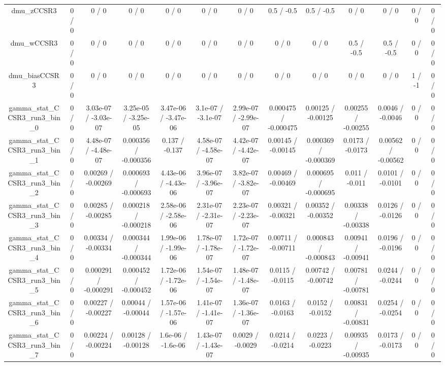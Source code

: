 \documentclass[10pt]{article}
\begin{document}
\begin{table}[htbp]
\begin{center}
\begin{tabular}{|c|c|c|c|c|c|c|c|c|c|c|c|c|}
  dmu_zCCSR3 & 0 / 0 & 0 / 0 & 0 / 0 & 0 / 0 & 0 / 0 & 0 / 0 & 0.5 / -0.5 & 0.5 / -0.5 & 0 / 0 & 0 / 0 & 0 / 0 & 0 / 0 \\ 
  dmu_wCCSR3 & 0 / 0 & 0 / 0 & 0 / 0 & 0 / 0 & 0 / 0 & 0 / 0 & 0 / 0 & 0 / 0 & 0.5 / -0.5 & 0.5 / -0.5 & 0 / 0 & 0 / 0 \\ 
  dmu_biasCCSR3 & 0 / 0 & 0 / 0 & 0 / 0 & 0 / 0 & 0 / 0 & 0 / 0 & 0 / 0 & 0 / 0 & 0 / 0 & 0 / 0 & 1 / -1 & 0 / 0 \\ 
  gamma_stat_CCSR3_run3_bin_0 & 0 / 0 & 3.03e-07 / -3.03e-07 & 3.25e-05 / -3.25e-05 & 3.47e-06 / -3.47e-06 & 3.1e-07 / -3.1e-07 & 2.99e-07 / -2.99e-07 & 0.000475 / -0.000475 & 0.00125 / -0.00125 & 0.00255 / -0.00255 & 0.0046 / -0.0046 & 0 / 0 & 0 / 0 \\ 
  gamma_stat_CCSR3_run3_bin_1 & 0 / 0 & 4.48e-07 / -4.48e-07 & 0.000356 / -0.000356 & 0.137 / -0.137 & 4.58e-07 / -4.58e-07 & 4.42e-07 / -4.42e-07 & 0.00145 / -0.00145 & 0.000369 / -0.000369 & 0.0173 / -0.0173 & 0.00562 / -0.00562 & 0 / 0 & 0 / 0 \\ 
  gamma_stat_CCSR3_run3_bin_2 & 0 / 0 & 0.00269 / -0.00269 & 0.000693 / -0.000693 & 4.43e-06 / -4.43e-06 & 3.96e-07 / -3.96e-07 & 3.82e-07 / -3.82e-07 & 0.00469 / -0.00469 & 0.000695 / -0.000695 & 0.011 / -0.011 & 0.0101 / -0.0101 & 0 / 0 & 0 / 0 \\ 
  gamma_stat_CCSR3_run3_bin_3 & 0 / 0 & 0.00285 / -0.00285 & 0.000218 / -0.000218 & 2.58e-06 / -2.58e-06 & 2.31e-07 / -2.31e-07 & 2.23e-07 / -2.23e-07 & 0.00321 / -0.00321 & 0.00352 / -0.00352 & 0.00338 / -0.00338 & 0.0126 / -0.0126 & 0 / 0 & 0 / 0 \\ 
  gamma_stat_CCSR3_run3_bin_4 & 0 / 0 & 0.00334 / -0.00334 & 0.000344 / -0.000344 & 1.99e-06 / -1.99e-06 & 1.78e-07 / -1.78e-07 & 1.72e-07 / -1.72e-07 & 0.00711 / -0.00711 & 0.000843 / -0.000843 & 0.00941 / -0.00941 & 0.0196 / -0.0196 & 0 / 0 & 0 / 0 \\ 
  gamma_stat_CCSR3_run3_bin_5 & 0 / 0 & 0.000291 / -0.000291 & 0.000452 / -0.000452 & 1.72e-06 / -1.72e-06 & 1.54e-07 / -1.54e-07 & 1.48e-07 / -1.48e-07 & 0.0115 / -0.0115 & 0.00742 / -0.00742 & 0.00781 / -0.00781 & 0.0244 / -0.0244 & 0 / 0 & 0 / 0 \\ 
  gamma_stat_CCSR3_run3_bin_6 & 0 / 0 & 0.00227 / -0.00227 & 0.00044 / -0.00044 & 1.57e-06 / -1.57e-06 & 1.41e-07 / -1.41e-07 & 1.36e-07 / -1.36e-07 & 0.0163 / -0.0163 & 0.0152 / -0.0152 & 0.00831 / -0.00831 & 0.0254 / -0.0254 & 0 / 0 & 0 / 0 \\ 
  gamma_stat_CCSR3_run3_bin_7 & 0 / 0 & 0.00224 / -0.00224 & 0.00128 / -0.00128 & 1.6e-06 / -1.6e-06 & 1.43e-07 / -1.43e-07 & 0.0029 / -0.0029 & 0.0214 / -0.0214 & 0.0223 / -0.0223 & 0.00935 / -0.00935 & 0.0173 / -0.0173 & 0 / 0 & 0 / 0 \\ 

\end{tabular}
\end{center}
\end{table}
\end{document}
